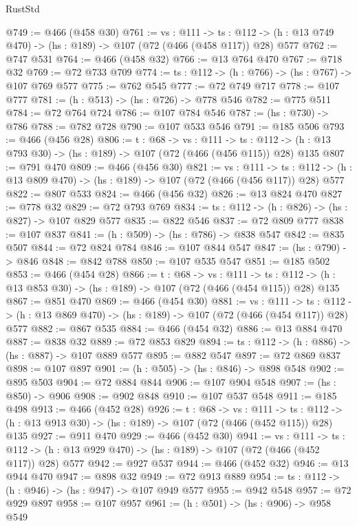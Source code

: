 \begin{lexlean}{RustStd}
\begin{coremodule}
@749 := @466 (@458 @30)
@761 := {vs : @111} ->
  {ts : @112} -> (h : @13 @749 @470) -> (hs : @189) -> @107 (@72 (@466 (@458 @117)) @28) @577
@762 := @747 @531
@764 := @466 (@458 @32)
@766 := @13 @764 @470
@767 := @718 @32
@769 := @72 @733 @709
@774 := {ts : @112} -> (h : @766) -> (hs : @767) -> @107 @769 @577
@775 := @762 @545
@777 := @72 @749 @717
@778 := @107 @777
@781 := (h : @513) -> (hs : @726) -> @778 @546
@782 := @775 @511
@784 := @72 @764 @724
@786 := @107 @784 @546
@787 := (hs : @730) -> @786
@788 := @782 @728
@790 := @107 @533 @546
@791 := @185 @506
@793 := @466 (@456 @28)
@806 := {t : @68} ->
  {vs : @111} ->
  {ts : @112} -> (h : @13 @793 @30) -> (hs : @189) -> @107 (@72 (@466 (@456 @115)) @28) @135
@807 := @791 @470
@809 := @466 (@456 @30)
@821 := {vs : @111} ->
  {ts : @112} -> (h : @13 @809 @470) -> (hs : @189) -> @107 (@72 (@466 (@456 @117)) @28) @577
@822 := @807 @533
@824 := @466 (@456 @32)
@826 := @13 @824 @470
@827 := @778 @32
@829 := @72 @793 @769
@834 := {ts : @112} -> (h : @826) -> (hs : @827) -> @107 @829 @577
@835 := @822 @546
@837 := @72 @809 @777
@838 := @107 @837
@841 := (h : @509) -> (hs : @786) -> @838 @547
@842 := @835 @507
@844 := @72 @824 @784
@846 := @107 @844 @547
@847 := (hs : @790) -> @846
@848 := @842 @788
@850 := @107 @535 @547
@851 := @185 @502
@853 := @466 (@454 @28)
@866 := {t : @68} ->
  {vs : @111} ->
  {ts : @112} -> (h : @13 @853 @30) -> (hs : @189) -> @107 (@72 (@466 (@454 @115)) @28) @135
@867 := @851 @470
@869 := @466 (@454 @30)
@881 := {vs : @111} ->
  {ts : @112} -> (h : @13 @869 @470) -> (hs : @189) -> @107 (@72 (@466 (@454 @117)) @28) @577
@882 := @867 @535
@884 := @466 (@454 @32)
@886 := @13 @884 @470
@887 := @838 @32
@889 := @72 @853 @829
@894 := {ts : @112} -> (h : @886) -> (hs : @887) -> @107 @889 @577
@895 := @882 @547
@897 := @72 @869 @837
@898 := @107 @897
@901 := (h : @505) -> (hs : @846) -> @898 @548
@902 := @895 @503
@904 := @72 @884 @844
@906 := @107 @904 @548
@907 := (hs : @850) -> @906
@908 := @902 @848
@910 := @107 @537 @548
@911 := @185 @498
@913 := @466 (@452 @28)
@926 := {t : @68} ->
  {vs : @111} ->
  {ts : @112} -> (h : @13 @913 @30) -> (hs : @189) -> @107 (@72 (@466 (@452 @115)) @28) @135
@927 := @911 @470
@929 := @466 (@452 @30)
@941 := {vs : @111} ->
  {ts : @112} -> (h : @13 @929 @470) -> (hs : @189) -> @107 (@72 (@466 (@452 @117)) @28) @577
@942 := @927 @537
@944 := @466 (@452 @32)
@946 := @13 @944 @470
@947 := @898 @32
@949 := @72 @913 @889
@954 := {ts : @112} -> (h : @946) -> (hs : @947) -> @107 @949 @577
@955 := @942 @548
@957 := @72 @929 @897
@958 := @107 @957
@961 := (h : @501) -> (hs : @906) -> @958 @549

\end{coremodule}
\end{lexlean}
